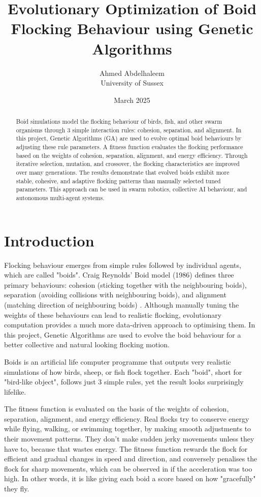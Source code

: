 \documentclass[twocolumn, a4paper, 12pt]{article}
\title{Evolutionary Optimization of Boid Flocking Behaviour using Genetic Algorithms}
\author{Ahmed Abdelhaleem \\ University of Sussex}
\date{March 2025}
\begin{document}
\maketitle


\begin{abstract}
  Boid simulations model the flocking behaviour of birds, fish, and other swarm organisms through 3 simple interaction rules: cohesion, separation, and alignment. In this project, Genetic Algorithms (GA) are used to evolve optimal boid behaviours by adjusting these rule parameters. A fitness function evaluates the flocking performance based on the weights of cohesion, separation, alignment, and energy efficiency. Through iterative selection, mutation, and crossover, the flocking characteristics are improved over many generations. The results demonstrate that evolved boids exhibit more stable, cohesive, and adaptive flocking patterns than manually selected tuned parameters. This approach can be used in swarm robotics, collective AI behaviour, and autonomous multi-agent systems.
\end{abstract}

\tableofcontents   %
\listoffigures     %


\section{Introduction}
Flocking behaviour emerges from simple rules followed by individual agents, which are called "boids". Craig Reynolds' Boid model (1986) defines three primary behaviours: cohesion (sticking together with the neighbouring boids), separation (avoiding collisions with neighbouring boids), and alignment (matching direction of neighbouring boids) \cite{reynolds1987flocks}. Although manually tuning the weights of these behaviours can lead to realistic flocking, evolutionary computation provides a much more data-driven approach to optimising them. In this project, Genetic Algorithms are used to evolve the boid behaviour for a better collective and natural looking flocking motion.

Boids is an artificial life computer programme that outputs very realistic simulations of how birds, sheep, or fish flock together. Each "boid", short for "bird-like object", follows just 3 simple rules, yet the result looks surprisingly lifelike.

The fitness function is evaluated on the basis of the weights of cohesion, separation, alignment, and energy efficiency. Real flocks try to conserve energy while flying, walking, or swimming together, by making smooth adjustments to their movement patterns. They don't make sudden jerky movements unless they have to, because that wastes energy. The fitness function rewards the flock for efficient and gradual changes in speed and direction, and conversely penalises the flock for sharp movements, which can be observed in if the acceleration was too high. In other words, it is like giving each boid a score based on how "gracefully" they fly.
\end{document}
